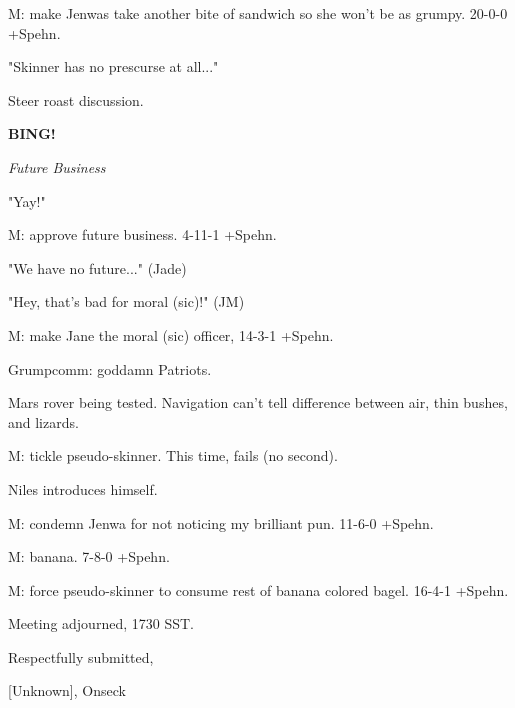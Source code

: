 \documentclass[12pt]{article}
\newcommand{\bing}{{\bf BING!} }
\newcommand{\goto}[1]{\bing \vskip 12pt \centerline{{\em{#1}}}}
\begin{document}
M: make Jenwas take another bite of sandwich so she won't be as grumpy. 20-0-0 +Spehn.

"Skinner has no prescurse at all..."

Steer roast discussion.

\goto{Future Business}

"Yay!"

M: approve future business. 4-11-1 +Spehn.

"We have no future..." (Jade)

"Hey, that's bad for moral (sic)!" (JM)

M: make Jane the moral (sic) officer, 14-3-1 +Spehn.

Grumpcomm: goddamn Patriots.

Mars rover being tested. Navigation can't tell difference between air, thin bushes, and lizards.

M: tickle pseudo-skinner. This time, fails (no second).

Niles introduces himself.

M: condemn Jenwa for not noticing my brilliant pun. 11-6-0 +Spehn.

M: banana. 7-8-0 +Spehn.

M: force pseudo-skinner to consume rest of banana colored bagel. 16-4-1 +Spehn.

\vspace{12pt}

\noindent
Meeting adjourned, 1730 SST.

\vspace{18pt}

\centerline{Respectfully submitted,}
\centerline{[Unknown], Onseck}
\end{document}
